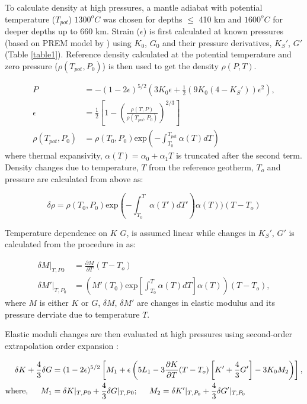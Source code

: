 \documentclass[draft,linenumbers]{agujournal2018}
\begin{document}
To calculate density at high pressures, a mantle adiabat with potential temperature ($T_{pot}$) $1300^o C$ was chosen for depths $\leq$ 410 km and $1600^o C $ for deeper depths up to 660 km. Strain ($\epsilon$) is first calculated at known pressures (based on PREM model by \citet{dziewonski1981preliminary}) using $K_0$, $G_0$ and their pressure derivatives, $K_S'$, $G'$  (Table \ref{table1}).  Reference density calculated at the potential temperature and zero pressure ($\rho(T_{pot}, P_0)$) is then used to get the density $\rho (P,T)$.

\begin{align*} 
    P &=  - (1 - 2\epsilon)^{5/2} \left( 3K_0 \epsilon + \frac{1}{2} ( 9K_0 ( 4 - K_S' )) \epsilon^2 \right),\\
    \epsilon &=  \frac{1}{2} \left[ 1 - \left( \frac{\rho(T,P)}{\rho(T_{pot}, P_0)} \right) ^{2/3} \right]\\
    \rho(T_{pot}, P_0) &=  \rho(T_0, P_0) \text{exp} \left( - \int_{T_0}^{T_{pot}} \alpha (T) dT \right)
\end{align*}
where thermal expansivity, $\alpha(T) = \alpha_0 + \alpha_1 T$ is truncated after the second term. Density changes due to temperature, $T$ from the reference geotherm, $T_o$ and pressure are calculated from above as:

\begin{equation}\label{den_der}
    \delta \rho = \rho(T_0, P_0) \text{exp} \left( - \int_{T_0}^{T} \alpha (T') dT' \right) \alpha(T) ) (T - T_o)
\end{equation}

Temperature dependence on $K$ $G$, is assumed linear while changes in $K_S'$, $G'$ is calculated from the procedure in \citep{duffy1989seismic} as: 

\begin{align*} 
    \delta M\vert_{T, P0} &= \frac{\partial M}{\partial T }  ( T - T_o )\\
    \delta M'\vert_{T, P_0} &=  \left( M'(T_0) \text{exp} \left[ \int_{T_0}^{T} \alpha (T) dT \right] \alpha(T) \right) ( T - T_o )  ,
\end{align*}
where $M$ is either $K$ or $G$, $\delta M$, $\delta M'$ are changes in elastic modulus and its  pressure derviate due to temperature $T$.

Elastic moduli changes are then evaluated at high pressures using second-order extrapolation order expansion \citep{duffy1989seismic}:

\begin{align} \label{M_der}
    \delta K + \frac{4}{3} \delta G &= ( 1 - 2 \epsilon)^{5/2} \left[ M_1 + \epsilon \left( 5 L_1 - 3 \frac{\partial K}{\partial T }  ( T - T_o ) \left[ K' + \frac{4}{3} G' \right] - 3K_0 M_2 \right)  \right], \\ 
    \text{where}, \hspace{0.5cm}
    M_1 &= \delta K\vert_{T, P0} + \frac{4}{3}\delta G\vert_{T, P0} ; \hspace{0.5cm}
    M_2 = \delta K'\vert_{T, P_0} + \frac{4}{3}\delta G'\vert_{T, P_0} \nonumber
\end{align}
\end{document}
